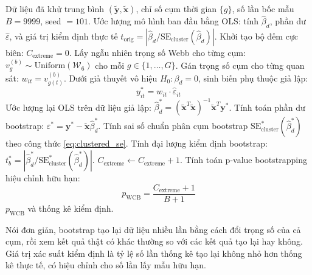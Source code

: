 \begin{algorithm}[H]
\caption{Kiểm định Giả thuyết $H_0: \beta_d = 0$ bằng bootstrap theo cụm với trọng số Webb}
\label{alg:wcb}
\begin{algorithmic}[1]
\Require Dữ liệu đã khử trung bình $(\widetilde{\mathbf{y}}, \widetilde{\mathbf{x}})$, chỉ số cụm thời gian $\{g\}$, số lần bốc mẫu $B = 9999$, seed $= 101$.
\State Ước lượng mô hình ban đầu bằng OLS: tính $\widehat{\beta}_d$, phần dư $\widehat{\varepsilon}$, và giá trị kiểm định thực tế $t_{\text{orig}} = |\widehat{\beta}_d / \text{SE}_{\text{cluster}}(\widehat{\beta}_d)|$.
\State Khởi tạo bộ đếm cực biên: $C_{\text{extreme}} = 0$.
    \State Lấy ngẫu nhiên trọng số Webb cho từng cụm: $v_g^{(b)} \sim \text{Uniform}(\mathcal{W}_6)$ cho mỗi $g \in \{1, \dots, G\}$.
    \State Gán trọng số cụm cho từng quan sát: $w_{it} = v_{g(t)}^{(b)}$.
    \State Dưới giả thuyết vô hiệu $H_0: \beta_d = 0$, sinh biến phụ thuộc giả lập:
    \begin{equation*}
    y_{it}^* = w_{it} \cdot \widehat{\varepsilon}_{it}
    \end{equation*}
    \State Ước lượng lại OLS trên dữ liệu giả lập: $\widehat{\beta}_d^* = (\widetilde{\mathbf{x}}^T \widetilde{\mathbf{x}})^{-1} \widetilde{\mathbf{x}}^T \mathbf{y}^*$.
    \State Tính toán phần dư bootstrap: $\varepsilon^* = \mathbf{y}^* - \widetilde{\mathbf{x}} \widehat{\beta}_d^*$.
    \State Tính sai số chuẩn phân cụm bootstrap $\text{SE}_{\text{cluster}}^*(\widehat{\beta}_d^*)$ theo công thức \eqref{eq:clustered_se}.
    \State Tính đại lượng kiểm định bootstrap: $t_b^* = |\widehat{\beta}_d^* / \text{SE}_{\text{cluster}}^*(\widehat{\beta}_d^*)|$.
        \State $C_{\text{extreme}} \leftarrow C_{\text{extreme}} + 1$.
    \EndIf
\EndFor
\State Tính toán p-value bootstrapping hiệu chỉnh hữu hạn:
\begin{equation}
p_{\text{WCB}} = \frac{C_{\text{extreme}} + 1}{B + 1}
\end{equation}
\State \Return $p_{\text{WCB}}$ và thống kê kiểm định.
\end{algorithmic}
\end{algorithm}
Nói đơn giản, bootstrap tạo lại dữ liệu nhiều lần bằng cách đổi trọng số của cả cụm, rồi xem kết quả thật có khác thường so với các kết quả tạo lại hay không. Giá trị xác suất kiểm định là tỷ lệ số lần thống kê tạo lại không nhỏ hơn thống kê thực tế, có hiệu chỉnh cho số lần lấy mẫu hữu hạn.
